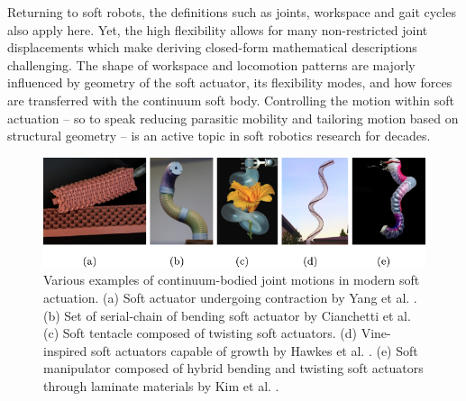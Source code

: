 Returning to soft robots,
the definitions such as {joints}, {workspace} and {gait cycles} also apply here. Yet, the high flexibility allows for many non-restricted joint displacements which make deriving closed-form mathematical descriptions challenging. The shape of workspace and locomotion patterns are majorly influenced by geometry of the soft actuator, its flexibility modes, and how forces are transferred with the continuum soft body. Controlling the motion within soft actuation -- so to speak reducing parasitic mobility and tailoring motion based on structural geometry -- is an active topic in soft robotics research for decades. \\

\begin{figure}[!t]
  \centering
  \includegraphics*[width=\textwidth]{./pdf/thesis-figure-1-2.pdf}
  \vspace{-6mm}
  \caption{Various examples of continuum-bodied joint motions in modern soft actuation. (a) Soft actuator undergoing contraction by Yang et al. \cite{Yang2016}. (b) Set of serial-chain of bending soft actuator by Cianchetti et al. \cite{Cianchetti2013Nov,Cianchetti2014} (c) Soft tentacle composed of twisting soft actuators. (d) Vine-inspired soft actuators capable of growth by Hawkes et al. \cite{Hawkes2017}. (e) Soft manipulator composed of hybrid bending and twisting soft actuators through laminate materials by Kim et al. \cite{Kim2019Aug}.}
  \label{fig:C0:actuationtypes}
\end{figure}

